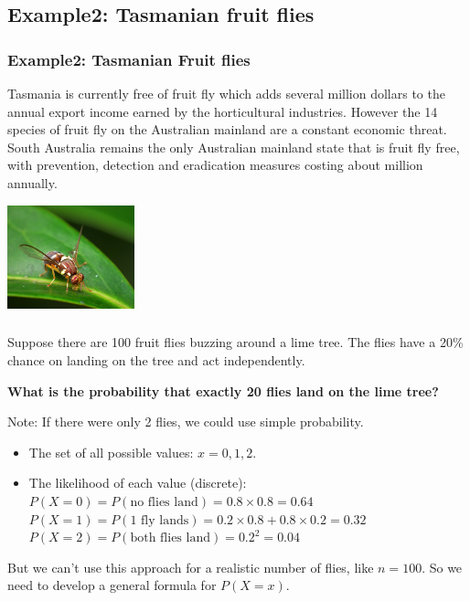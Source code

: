 \documentclass[t,xcolor=pdftex,dvipsnames,table]{beamer}\usepackage[]{graphicx}\usepackage[]{color}
\begin{document}
\subsection{Example2: Tasmanian fruit flies}
\begin{frame}\frametitle{Example2: Tasmanian Fruit flies}

Tasmania is currently free of fruit fly which adds several million dollars to the annual export income earned by the horticultural industries. However the 14 species of fruit fly on the Australian mainland are a constant economic threat. South Australia remains the only Australian mainland state that is fruit fly free, with prevention, detection and eradication measures costing about  million annually. 

\begin{center}
\includegraphics[height=3cm]{../images/Queensland_Fruit_Fly_-_Bactrocera_tryoni.jpg}
\end{center}
\href{http://dpipwe.tas.gov.au/biosecurity/plant-biosecurity/pests-and-diseases/fruit-fly}{}
\href{http://pir.sa.gov.au/biosecurity/fruit\_fly}{}
\end{frame}

\begin{frame}\frametitle{}

Suppose there are 100 fruit flies buzzing around a lime tree. The flies have a 20\% chance on landing on the tree and act independently. 

\vspace{.5cm}
{\bf What is the probability that exactly 20 flies land on the lime tree?}

\vspace{1cm}
{\tiny Note: If there were only 2 flies, we could use simple probability.
\begin{itemize}
\item The set of all possible values: $x=0,1,2$.
\item  The likelihood of each value (discrete): \\
$P(X=0) = P(\mbox{no flies land}) = 0.8 \times 0.8 = 0.64$ \\
$P(X=1) = P(\mbox{1 fly lands}) = 0.2 \times 0.8 +  0.8 \times 0.2 = 0.32$ \\
$P(X=2) = P(\mbox{both flies land}) = 0.2^2  = 0.04$ \\
\end{itemize}

But we can't use this approach for a  realistic number of flies, like $n=100$. So we need to develop a general formula for $P(X=x)$.}
\end{frame}
\end{document}
